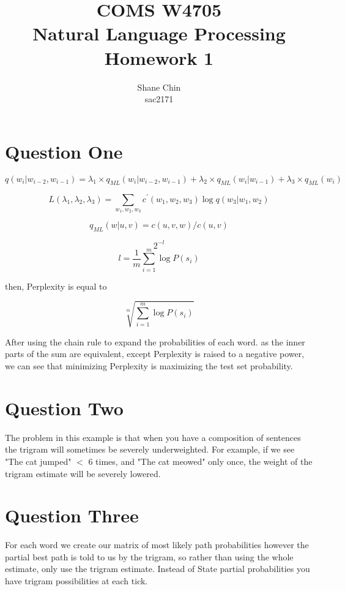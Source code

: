 \documentclass[12pt]{article}
\title{COMS W4705 \\ Natural Language Processing\\Homework 1}
\author{Shane Chin\\sac2171}
\date{}
\begin{document}
\maketitle

\section{Question One}

\[ q(w_i | w_{i-2}, w_{i-1}) = \lambda_1 \times q_{ML}(w_i | w_{i-2}, w_{i-1}) + \lambda_2 \times q_{ML} (w_i | w_{i-1}) + \lambda_3 \times q_{ML} (w_i) \]

\[ L(\lambda_1 , \lambda_2 ,\lambda_3 ) = \sum_{w_1,w_2,w_3} {c^\prime(w_1,w_2,w_3)}\log q(w_3 | w_1, w_2) \]

\[ q_{ML}(w|u,v) = c(u,v,w)/c(u,v) \]

\[ 2^{-l} \]  \[l = \frac{1}{m} \sum^m_{i=1}{\log P(s_i)}\]

then, Perplexity is equal to 

\[ \sqrt[m]{\sum^m_{i=1}{\log P(s_i)}}\]

After using the chain rule to expand the probabilities of each word. as the inner parts of the sum are equivalent, except Perplexity is raised to a negative power,
we can see that minimizing Perplexity is maximizing the test set probability. 

\section{Question Two}

The problem in this example is that when you have a composition of sentences the trigram will sometimes be severely underweighted.
For example, if we see "The cat jumped" $<$ 6 times, and "The cat meowed" only once, the weight of the trigram estimate will be
severely lowered.

\section{Question Three }

For each word we create our matrix of most likely path probabilities
however the partial best path is told to us by the trigram, so rather than using
the whole estimate, only use the trigram estimate.
Instead of State partial probabilities you have trigram possibilities at each tick.
\end{document}
